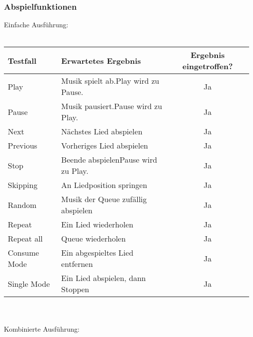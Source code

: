 \subsubsection{Abspielfunktionen}
Einfache Ausführung:\ \\ \\
\begin{tabular}[c]{|l|p{6cm}|c|}
\hline
\textbf{Testfall} & \textbf{Erwartetes Ergebnis} & \textbf{Ergebnis eingetroffen?}\\
\hline
Play & Musik spielt ab.\newline Play wird zu Pause. & Ja\\
\hline
Pause & Musik pausiert.\newline Pause wird zu Play. & Ja\\
\hline
Next & Nächstes Lied abspielen & Ja\\
\hline
Previous & Vorheriges Lied abspielen & Ja\\
\hline
Stop & Beende abspielen\newline Pause wird zu Play. & Ja\\
\hline
Skipping & An Liedposition springen & Ja\\
\hline
Random & Musik der Queue zufällig abspielen & Ja\\
\hline 
Repeat & Ein Lied wiederholen & Ja\\
\hline
Repeat all & Queue wiederholen & Ja\\
\hline
Consume Mode & Ein abgespieltes Lied entfernen & Ja\\
\hline
Single Mode & Ein Lied abspielen, dann Stoppen & Ja\\
\hline
\end{tabular}
\ \\ \\
Kombinierte Ausführung:\ \\ \\
